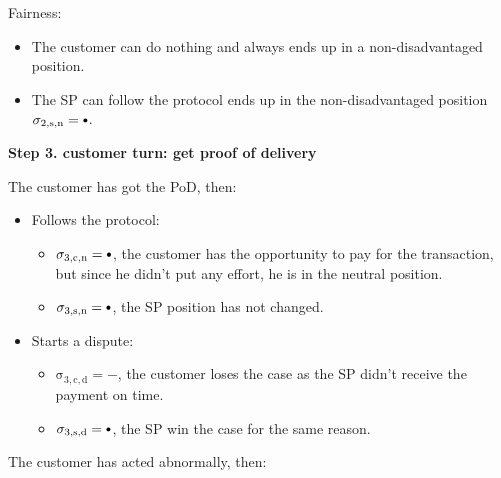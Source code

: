 \documentclass{ieeeaccess}
\newcommand\sbullet[1][.75]{\mathbin{\ThisStyle{\vcenter{\hbox{%
  \scalebox{#1}{$\SavedStyle\bullet$}}}}}%
}
\begin{document}
Fairness:

\begin{itemize}

\item The customer can do nothing and always ends up in a non-disadvantaged position.
\item The SP can follow the protocol ends up in the non-disadvantaged position \(\operatorname{\sigma_{2, s, n} = \sbullet}\).

\end{itemize}

\noindent \textbf
{Step 3. customer turn: get proof of delivery}\label{step-3-get-proof-of-delivery}

The customer has got the PoD, then:

\begin{itemize}
\item
  Follows the protocol:

  \begin{itemize}
  
  \item
    $\operatorname{\sigma_{3, c, n} = \sbullet}$, the customer has the opportunity to pay for the transaction, but since he didn't put any effort, he is in the neutral position.
  \item
    $\operatorname{\sigma_{3, s, n} = \sbullet}$, the SP position has not changed.
  \end{itemize}
\item
  Starts a dispute:

  \begin{itemize}
  
  \item
    $\operatorname{\sigma_{3, c, d} = -}$, the customer loses the case as the SP didn't receive the payment on time.
  \item
    $\operatorname{\sigma_{3, s, d} = \sbullet}$, the SP win the case for the same reason.
  \end{itemize}
\end{itemize}

The customer has acted abnormally, then:
\end{document}
